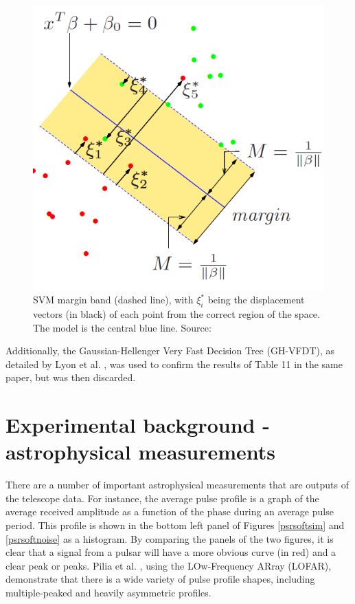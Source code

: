 \documentclass[12pt]{article}
\begin{document}
\begin{figure}[h!]
\begin{center}
\includegraphics[scale=0.5]{svm.png}
\caption{SVM margin band (dashed line), with $\xi_{i}^{*}$ being the displacement vectors (in black) of each point from the correct region of the space. The model is the central blue line. Source: \cite{friedman2001elements}}
\label{svm}
\end{center}
\end{figure}

Additionally, the Gaussian-Hellenger Very Fast Decision Tree (GH-VFDT), as detailed by Lyon et al. \cite{lyon2016fifty}, was used to confirm the results of Table 11 in the same paper, but was then discarded.

\section{Experimental background - astrophysical measurements}
There are a number of important astrophysical measurements that are outputs of the telescope data. For instance, the average pulse profile is a graph of the average received amplitude as a function of the phase during an average pulse period. This profile is shown in the bottom left panel of Figures \ref{psrsoftsim} and \ref{psrsoftnoise} as a histogram. By comparing the panels of the two figures, it is clear that a signal from a pulsar will have a more obvious curve (in red) and a clear peak or peaks. Pilia et al. \cite{pilia2016wide}, using the LOw-Frequency ARray (LOFAR), demonstrate that there is a wide variety of pulse profile shapes, including multiple-peaked and heavily asymmetric profiles.
\end{document}

